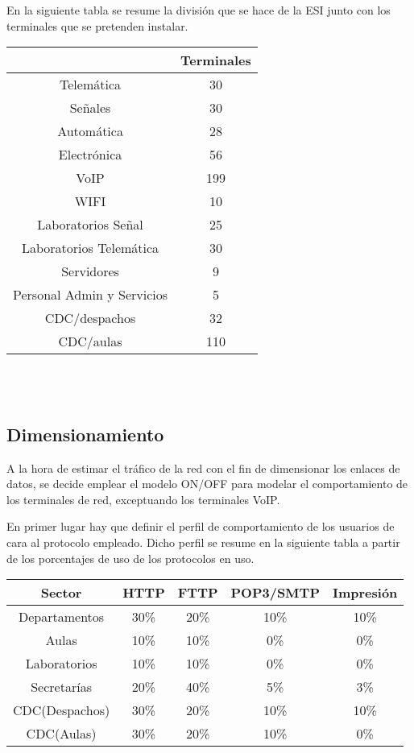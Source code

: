 \documentclass[a4paper,10pt]{article}
\begin{document}
En la siguiente tabla se resume la división que se hace de la ESI junto con los terminales que se pretenden instalar.

\begin{tabular}{|c|c|}
\hline   & \textbf{Terminales} \\ 
\hline  Telemática & 30 \\ 
\hline  Señales & 30 \\ 
\hline  Automática & 28 \\ 
\hline  Electrónica & 56 \\ 
\hline  VoIP & 199 \\ 
\hline  WIFI & 10 \\ 
\hline  Laboratorios Señal & 25 \\ 
\hline  Laboratorios Telemática & 30 \\ 
\hline  Servidores & 9 \\ 
\hline  Personal Admin y Servicios & 5 \\ 
\hline  CDC/despachos & 32 \\ 
\hline  CDC/aulas & 110 \\ 
\hline 
\end{tabular} \\ \\


\subsection{Dimensionamiento}
A la hora de estimar el tráfico de la red con el fin de dimensionar los enlaces de datos, se decide emplear el modelo ON/OFF para modelar el comportamiento de los terminales de red, exceptuando los terminales VoIP.

En primer lugar hay que definir el perfil de comportamiento de los usuarios de cara al protocolo empleado. Dicho perfil se resume en la siguiente tabla a partir de los porcentajes de uso de los protocolos en uso.\\

\begin{tabular}{|c|c|c|c|c|}
\hline 
Sector & HTTP & FTTP & POP3/SMTP & Impresión \\ 
\hline 
Departamentos & 30\% & 20\% & 10\% & 10\% \\ 
\hline 
Aulas  & 10\% & 10\% & 0\% & 0\% \\ 
\hline 
Laboratorios & 10\% & 10\% & 0\% & 0\% \\ 
\hline 
Secretarías & 20\% & 40\% & 5\% & 3\% \\ 
\hline 
CDC(Despachos) & 30\% & 20\% & 10\% & 10\% \\ 
\hline 
CDC(Aulas) & 30\% & 20\% & 10\% & 0\% \\ 
\hline 
\end{tabular}\\
\end{document}
